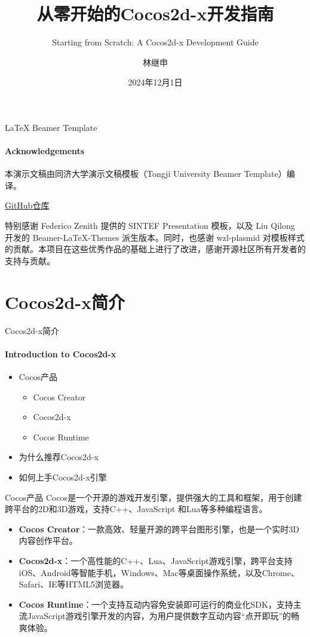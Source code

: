\documentclass{beamer}
\title{从零开始的Cocos2d-x开发指南}
\subtitle{Starting from Scratch: A Cocos2d-x Development Guide}
\author{林继申}
\date{2024年12月1日}
\newcommand{\hrefcol}[2]{\textcolor{cyan}{\href{#1}{#2}}}
\begin{document}
\maketitle


\begin{frame}[fragile]{LaTeX Beamer Template}
\framesubtitle{Acknowledgements}
本演示文稿由同济大学演示文稿模板（Tongji University Beamer Template）编译。

\vspace{1em}

\hrefcol{https://github.com/MinmusLin/Tongji_University_Beamer_Template}{GitHub仓库}

\vspace{1em}

特别感谢 Federico Zenith 提供的 SINTEF Presentation 模板，以及 Liu Qilong 开发的 Beamer-LaTeX-Themes 派生版本。同时，也感谢 wzl-plasmid 对模板样式的贡献。本项目在这些优秀作品的基础上进行了改进，感谢开源社区所有开发者的支持与贡献。
\end{frame}


\section{Cocos2d-x简介}


\begin{chapter}{}{Cocos2d-x简介}
\framesubtitle{Introduction to Cocos2d-x}
\begin{itemize}
\item Cocos产品
\begin{itemize}
\item Cocos Creator
\item Cocos2d-x
\item Cocos Runtime
\end{itemize}
\item 为什么推荐Cocos2d-x
\item 如何上手Cocos2d-x引擎
\end{itemize}
\end{chapter}


\begin{frame}[fragile]{Cocos产品}
Cocos是一个开源的游戏开发引擎，提供强大的工具和框架，用于创建跨平台的2D和3D游戏，支持C++、JavaScript 和Lua等多种编程语言。
\begin{itemize}
\item \textbf{Cocos Creator}：一款高效、轻量开源的跨平台图形引擎，也是一个实时3D内容创作平台。
\item \textbf{Cocos2d-x}：一个高性能的C++、Lua、JavaScript游戏引擎，跨平台支持iOS、Android等智能手机，Windows、Mac等桌面操作系统，以及Chrome、Safari、IE等HTML5浏览器。
\item \textbf{Cocos Runtime}：一个支持互动内容免安装即可运行的商业化SDK，支持主流JavaScript游戏引擎开发的内容，为用户提供数字互动内容“点开即玩”的畅爽体验。
\end{itemize}
\end{frame}
\end{document}
